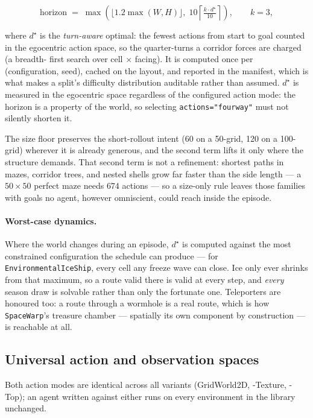 \documentclass[11pt]{article}
\begin{document}
\[
  \text{horizon} \;=\; \max\!\left(
    \lfloor 1.2\max(W,H)\rfloor,\;
    10\left\lceil \tfrac{k \cdot d^{\star}}{10} \right\rceil
  \right), \qquad k = 3,
\]

\noindent where $d^{\star}$ is the \emph{turn-aware} optimal: the
fewest actions from start to goal counted in the egocentric action
space, so the quarter-turns a corridor forces are charged (a breadth-
first search over cell $\times$ facing). It is computed once per
(configuration, seed), cached on the layout, and reported in the
manifest, which is what makes a split's difficulty distribution
auditable rather than assumed. $d^{\star}$ is measured in the
egocentric space regardless of the configured action mode: the
horizon is a property of the world, so selecting
\texttt{actions="fourway"} must not silently shorten it.

The size floor preserves the short-rollout intent (60 on a 50-grid,
120 on a 100-grid) wherever it is already generous, and the second
term lifts it only where the structure demands. That second term is
not a refinement: shortest paths in mazes, corridor trees, and nested
shells grow far faster than the side length --- a $50 \times 50$
perfect maze needs $674$ actions --- so a size-only rule leaves those
families with goals no agent, however omniscient, could reach inside
the episode.

\paragraph{Worst-case dynamics.} Where the world changes during an
episode, $d^{\star}$ is computed against the most constrained
configuration the schedule can produce --- for
\texttt{EnvironmentalIceShip}, every cell any freeze wave can close.
Ice only ever shrinks from that maximum, so a route valid there is
valid at every step, and \emph{every} season draw is solvable rather
than only the fortunate one. Teleporters are honoured too: a route
through a wormhole is a real route, which is how \texttt{SpaceWarp}'s
treasure chamber --- spatially its own component by construction --- is
reachable at all.

\subsection{Universal action and observation spaces}
\label{sec:spaces}

Both action modes are identical across all variants (GridWorld2D,
-Texture, -Top); an agent written against either runs on every
environment in the library unchanged.
\end{document}
